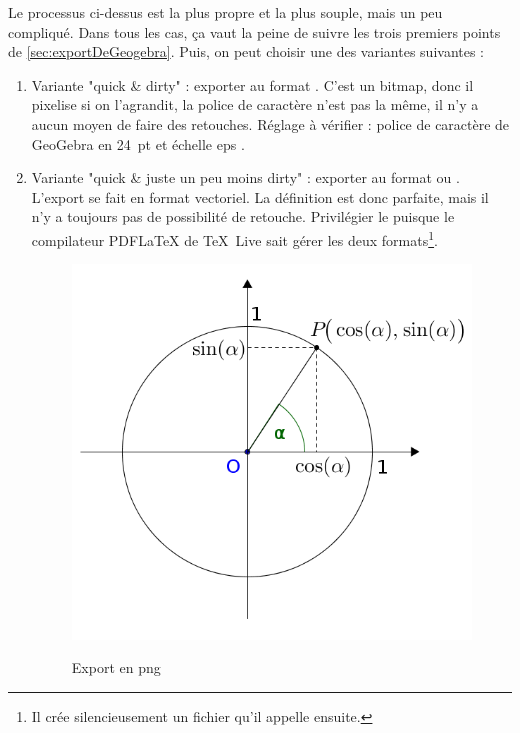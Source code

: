 Le processus ci-dessus est la plus propre et la plus souple, mais un peu compliqué. Dans tous les cas, ça vaut la peine de suivre les trois premiers points de \ref{sec:exportDeGeogebra}. Puis, on peut choisir une des variantes suivantes :
\begin{enumerate}
	\item Variante "quick \& dirty" : exporter au format . C'est un bitmap, donc il pixelise si on l'agrandit, la police de caractère n'est pas la même, il n'y a aucun moyen de faire des retouches. Réglage à vérifier : police de caractère de GeoGebra en \SI{24}{pt} et échelle eps .
	\item Variante "quick \& juste un peu moins dirty" : exporter au format  ou . L'export se fait en format vectoriel. La définition est donc parfaite, mais il n'y a toujours pas de possibilité de retouche. Privilégier le  puisque le compilateur PDFLaTeX de \TeX \ Live sait gérer les deux formats\footnote{Il crée silencieusement un fichier  qu'il appelle ensuite.}.\\
	\begin{minipage}{.48\linewidth}
		\begin{figure}[H]
			\centering
			\includegraphics[width=\linewidth]{figures/fig_11_05_cercle_cos_sin.png}
			\label{fig:11_05_cercle_cos_sin2}
			\vspace*{-5ex}
			\caption{Export en png}

\end{figure}
\end{minipage}
\end{enumerate}
